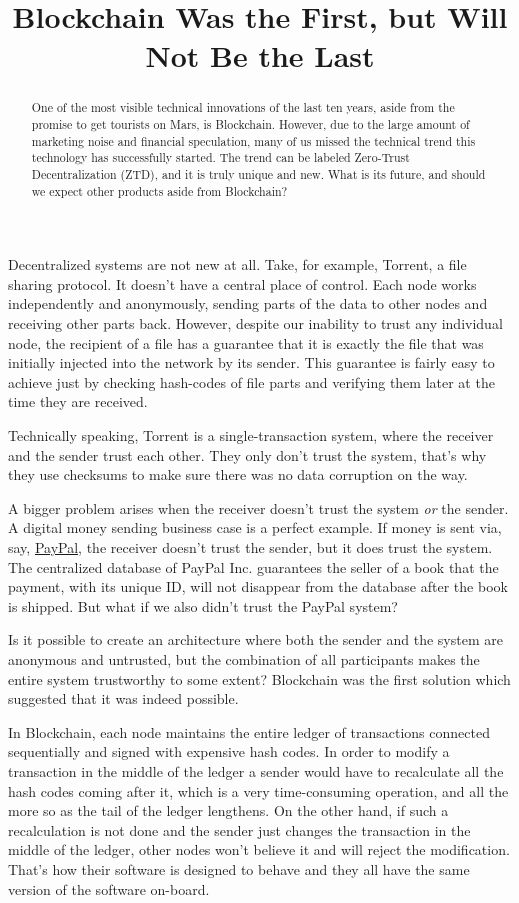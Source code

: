 \documentclass{main}
\title{Blockchain Was the First, but Will Not Be the Last}
\begin{document}
\begin{abstract}
One of the most visible technical innovations of the last ten years,
aside from the promise to get tourists on Mars, is Blockchain. However,
due to the large amount of marketing noise and financial speculation, many
of us missed the technical trend this technology has successfully started.
The trend can be labeled Zero-Trust Decentralization (ZTD), and it
is truly unique and new. What is its future, and should we
expect other products aside from Blockchain?
\end{abstract}

Decentralized systems are not new at all. Take, for example, Torrent, a file sharing
protocol. It doesn't have a central place of control. Each node
works independently and anonymously, sending parts of the data to other nodes
and receiving other parts back.  However, despite our inability to trust
any individual node, the recipient of a file has a guarantee that it is
exactly the file that was initially injected into the network by its sender.
This guarantee is fairly easy to achieve just by checking hash-codes
of file parts and verifying them later at the time they are received.

Technically speaking, Torrent is a single-transaction system, where the
receiver and the sender trust each other. They only don't trust the system,
that's why they use checksums to make sure there was no data corruption
on the way.

A bigger problem arises when the receiver doesn't trust the system \emph{or}
the sender. A digital money sending business case is a perfect example. If money
is sent via, say, \href{https://www.paypal.com}{PayPal}, the receiver doesn't trust the sender, but it
does trust the system. The centralized database of PayPal Inc. guarantees
the seller of a book that the payment, with its unique ID, will
not disappear from the database after the book is shipped. But what if we also didn't trust
the PayPal system?

Is it possible to create an architecture where both the sender and the system
are anonymous and untrusted, but the combination of all participants
makes the entire system trustworthy to some extent? Blockchain was the first
solution which suggested that it was indeed possible.

In Blockchain, each node maintains the entire ledger of transactions
connected sequentially and signed with expensive hash codes. In order to modify
a transaction in the middle of the ledger a sender would have to recalculate
all the hash codes coming after it, which is a very time-consuming operation,
and all the more so as the tail of the ledger lengthens. On the other hand,
if such a recalculation is not done and the sender just changes the
transaction in the middle of the ledger, other nodes won't believe it and
will reject the modification. That's how their software is designed to behave
and they all have the same version of the software on-board.
\end{document}
